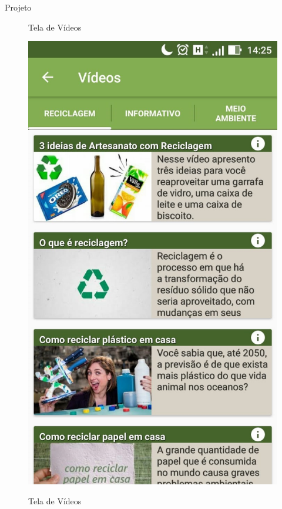\documentclass[
	12pt,				%
	openany,			%
	twoside,			%
	a4paper,			%
	english,			%
	french,				%
	spanish,			%
	brazil				%
	]{abntex2}
\begin{document}
\begin{chapter}{Projeto}
    \begin{figure}[htb]    
 \centering
  \begin{minipage}{0.45\textwidth}
    \centering
    \caption{Tela de Vídeos}
    \includegraphics[scale=0.35]{media/tela_videos_1.jpg}
     \label{fig:tela_videos_1}
  \end{minipage}
  \hfill
  \begin{minipage}{0.45\textwidth}
    \centering
    \caption{Tela de Vídeos}

\end{minipage}
\end{figure}
\end{chapter}
\end{document}
